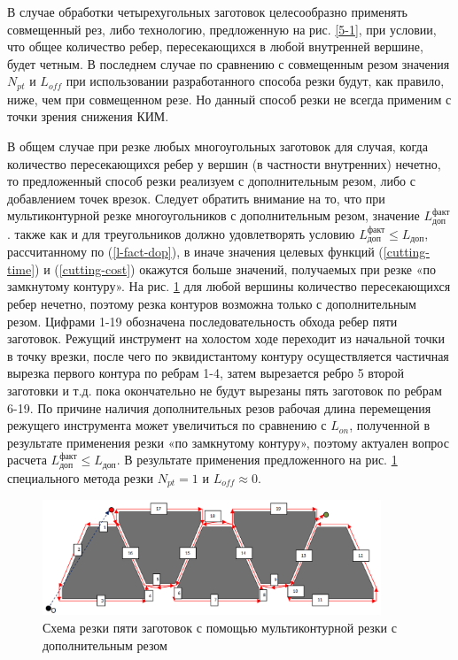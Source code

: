 \documentclass{article}
\begin{document}
В случае обработки четырехугольных заготовок
целесообразно применять совмещенный рез,
либо технологию, предложенную на рис. \ref{5-1},
при условии, что общее количество ребер,
пересекающихся в любой внутренней вершине, будет четным.
В последнем случае по сравнению с совмещенным резом значения
$N_{pt}$
и $L_{off}$
при использовании разработанного способа резки будут,
как правило, ниже, чем при совмещенном резе.
Но данный способ резки не всегда применим
с точки зрения снижения КИМ.

В общем случае при резке любых многоугольных
заготовок для случая,
когда количество пересекающихся ребер у вершин
(в частности внутренних) нечетно,
то предложенный способ резки реализуем с
дополнительным резом, либо с добавлением точек врезок.
Следует обратить внимание на то,
что при мультиконтурной резке многоугольников с
дополнительным резом, значение
$L_\text{доп}^\text{факт}$.
также как и для треугольников должно удовлетворять условию
$L_\text{доп}^\text{факт} \leqslant L_\text{доп}$,
рассчитанному по (\ref{l-fact-dop}),
в иначе значения целевых функций (\ref{cutting-time})
и (\ref{cutting-cost})
окажутся больше значений,
получаемых  при резке «по замкнутому контуру».
На рис. \ref{5-extra}
для любой вершины количество пересекающихся ребер нечетно,
поэтому резка контуров возможна только с дополнительным резом.
Цифрами 1-19 обозначена последовательность обхода ребер
пяти заготовок.
Режущий инструмент на холостом ходе переходит
из начальной точки в точку врезки,
после чего по эквидистантому контуру
осуществляется частичная вырезка первого
контура по ребрам 1-4,
затем вырезается ребро 5 второй заготовки и т.д.
пока окончательно не будут вырезаны пять заготовок по ребрам 6-19.
По причине наличия дополнительных резов рабочая
длина перемещения режущего инструмента может увеличиться по сравнению с $L_{on}$,
полученной в результате применения резки «по замкнутому контуру»,
поэтому актуален вопрос расчета
$L_\text{доп}^\text{факт} \leqslant L_\text{доп}$.
В результате применения предложенного на рис. \ref{5-extra}
специального метода резки
$N_{pt}=1$
и $L_{off} \approx 0$.

\begin{figure}
  \begin{center}
  \includegraphics[width=0.9\textwidth]{5-extra.png}
  \caption{Схема резки пяти заготовок с помощью мультиконтурной резки с дополнительным резом}
  \label{5-extra}
  \end{center}
\end{figure}
\end{document}
